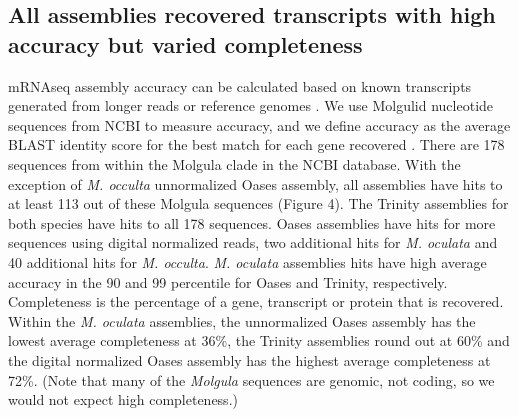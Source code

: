 \subsection{All assemblies recovered transcripts with high accuracy but varied completeness}
mRNAseq assembly accuracy can be calculated based on known transcripts generated from longer reads or reference genomes \citep{vijay_challenges_2012,martin_next-generation_2011}. We use Molgulid nucleotide sequences from NCBI to measure accuracy, and we define accuracy as the average BLAST identity score for the best match for each gene recovered \citep{li_sequence_2009}. There are 178 sequences from within the Molgula clade in the NCBI database. With the exception of \textit{M. occulta} unnormalized Oases assembly, all assemblies have hits to at least 113 out of these Molgula sequences (Figure 4). The Trinity assemblies for both species have hits to all 178 sequences. Oases assemblies have hits for more sequences using digital normalized reads, two additional hits for \textit{M. oculata} and 40 additional hits for \textit{M. occulta}. \textit{M. oculata} assemblies hits have high average accuracy in the 90 and 99 percentile for Oases and Trinity, respectively. Completeness is the percentage of a gene, transcript or protein that is recovered. Within the \textit{M. oculata} assemblies, the unnormalized Oases assembly has the lowest average completeness at 36\%, the Trinity assemblies round out at 60\% and the digital normalized Oases assembly has the highest average completeness at 72\%.  (Note that many of the \textit{Molgula} sequences are genomic, not coding, so we would not expect high completeness.)
	

